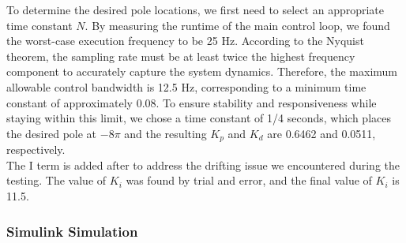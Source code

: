 \documentclass{article}
\begin{document}
To determine the desired pole locations, we first need to select an appropriate
time constant $N$. By measuring the runtime of the main control loop, we found
the worst-case execution frequency to be 25 Hz. According to the Nyquist
theorem, the sampling rate must be at least twice the highest frequency
component to accurately capture the system dynamics. Therefore, the maximum
allowable control bandwidth is 12.5 Hz, corresponding to a minimum time constant
of approximately 0.08. To ensure stability and responsiveness while staying
within this limit, we chose a time constant of 1/4 seconds, which places the
desired pole at $-8\pi$ and the resulting $K_p$ and $K_d$ are 0.6462 and 0.0511,
respectively. \\

The I term is added after to address the drifting issue we encountered during
the testing. The value of $K_i$ was found by trial and error, and the final
value of $K_i$ is 11.5. \\

\subsubsection{Simulink Simulation}
\end{document}
